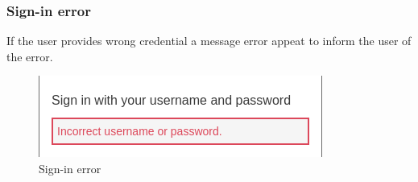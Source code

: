 \subsubsection{Sign-in error}
If the user provides wrong credential a message error appeat to inform the user of the error.
\begin{figure}[!ht]
    \caption{Sign-in error}
    \vspace{10px}
    \includegraphics[scale=0.3]{../../../../Images/userManual/singInError.png}
    \centering
\end{figure}
\newpage
